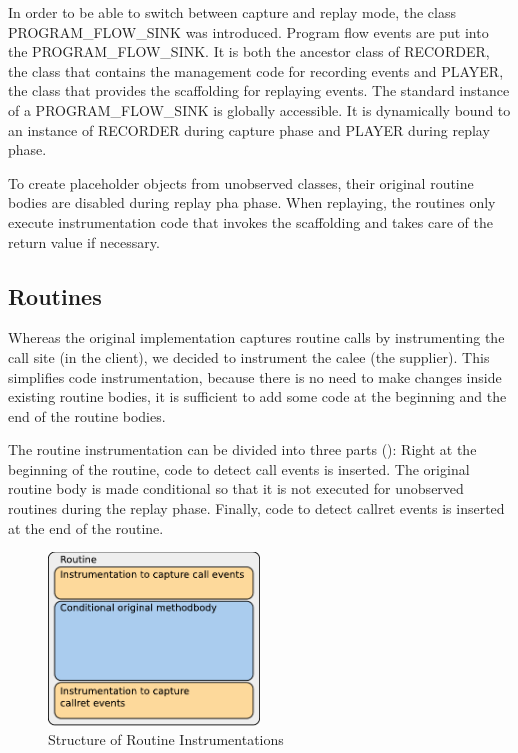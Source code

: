In order to be able to switch between capture and replay mode, the class PROGRAM\_FLOW\_SINK was introduced. Program flow events are put into the PROGRAM\_FLOW\_SINK. It is both the ancestor class of RECORDER, the class that contains the management code for recording events and PLAYER, the class that provides the scaffolding for replaying events. The standard instance of a PROGRAM\_FLOW\_SINK is globally accessible. It is dynamically bound to an instance of RECORDER during capture phase and PLAYER during replay phase.

To create placeholder objects from unobserved classes, their original routine bodies are disabled during replay pha phase. When replaying, the routines only execute instrumentation code that invokes the scaffolding and takes care of the return value if necessary.

\subsection{Routines}
Whereas the original implementation captures routine calls by instrumenting the call site (in the client), we decided to instrument the calee (the supplier). This simplifies code instrumentation, because there is no need to make changes inside existing routine bodies, it is sufficient to add some code at the beginning and the end of the routine bodies. %

The routine instrumentation can be divided into three parts (): Right at the beginning of the routine, code to detect call events is inserted. The original routine body is made conditional so that it is not executed for unobserved routines during the replay phase. Finally, code to detect callret events is inserted at the end of the routine.
\begin{figure}[ht]
  \centering
  \includegraphics[width=0.5\textwidth]{illustrations/routine_instrumentation_structure}
  \caption{Structure of Routine Instrumentations}
  \label{fig:routine_instrumentation_structure}
\end{figure}

